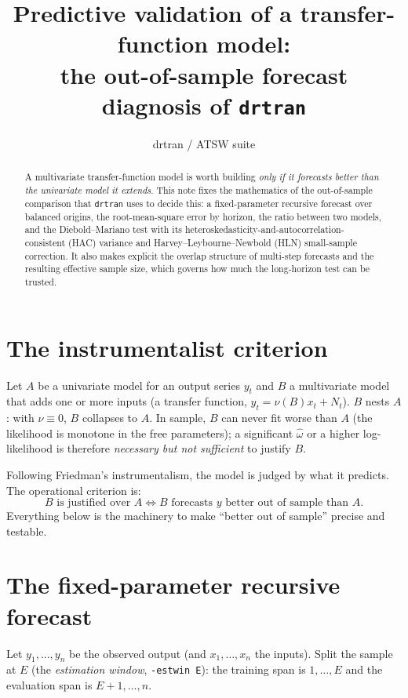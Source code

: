 \documentclass[11pt]{article}
\title{Predictive validation of a transfer-function model:\\
       the out-of-sample forecast diagnosis of \texttt{drtran}}
\author{drtran / ATSW suite}
\date{}
\begin{document}
\maketitle

\begin{abstract}
A multivariate transfer-function model is worth building \emph{only if it
forecasts better than the univariate model it extends}. This note fixes the
mathematics of the out-of-sample comparison that \texttt{drtran} uses to decide
this: a fixed-parameter recursive forecast over balanced origins, the
root-mean-square error by horizon, the ratio between two models, and the
Diebold--Mariano test with its heteroskedasticity-and-autocorrelation-consistent
(HAC) variance and Harvey--Leybourne--Newbold (HLN) small-sample correction. It
also makes explicit the overlap structure of multi-step forecasts and the
resulting effective sample size, which governs how much the long-horizon test
can be trusted.
\end{abstract}

\section{The instrumentalist criterion}

Let $A$ be a univariate model for an output series $y_t$ and $B$ a multivariate
model that adds one or more inputs (a transfer function, $y_t=\nu(B)x_t+N_t$).
$B$ nests $A$: with $\nu\equiv 0$, $B$ collapses to $A$. In sample, $B$ can never
fit worse than $A$ (the likelihood is monotone in the free parameters); a
significant $\hat\omega$ or a higher log-likelihood is therefore \emph{necessary
but not sufficient} to justify $B$.

Following Friedman's instrumentalism, the model is judged by what it predicts.
The operational criterion is:
\[
\boxed{\;B \text{ is justified over } A \iff B \text{ forecasts } y \text{ better
out of sample than } A.\;}
\]
Everything below is the machinery to make ``better out of sample'' precise and
testable.

\section{The fixed-parameter recursive forecast}

Let $y_1,\dots,y_n$ be the observed output (and $x_1,\dots,x_n$ the inputs).
Split the sample at $E$ (the \emph{estimation window}, \texttt{-estwin E}): the
training span is $1,\dots,E$ and the evaluation span is $E+1,\dots,n$.
\end{document}

